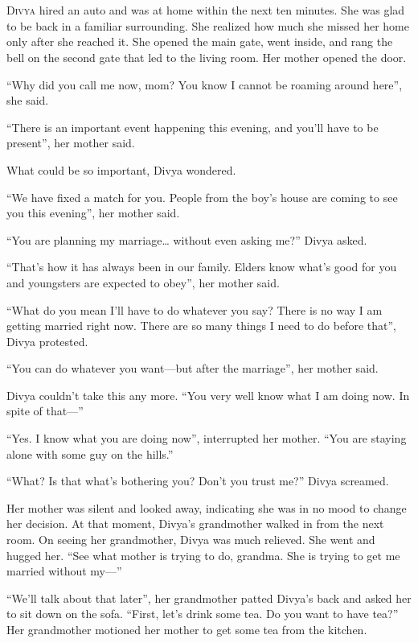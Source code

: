 \chapter{}

\lettrine{D}{ivya} hired an auto and was at home within the next ten minutes.
She was glad to be back in a familiar surrounding. She realized how much she
missed her home only after she reached it. She opened the main gate, went
inside, and rang the bell on the second gate that led to the living room. Her
mother opened the door.

“Why did you call me now, mom? You know I cannot be roaming around here”, she
said.

“There is an important event happening this evening, and you'll have to be
present”, her mother said.

What could be so important, Divya wondered.

“We have fixed a match for you. People from the boy's house are coming to see
you this evening”, her mother said.

“You are planning my marriage… without even asking me?” Divya asked.

“That's how it has always been in our family. Elders know what's good for you
and youngsters are expected to obey”, her mother said.

“What do you mean I'll have to do whatever you say? There is no way I am getting
married right now. There are so many things I need to do before that”, Divya
protested.

“You can do whatever you want—but after the marriage”, her mother said.

Divya couldn't take this any more. “You very well know what I am doing now. In
spite of that—”

“Yes. I know what you are doing now”, interrupted her mother. “You are staying
alone with some guy on the hills.”

“What? Is that what's bothering you? Don't you trust me?” Divya screamed.

Her mother was silent and looked away, indicating she was in no mood to change
her decision. At that moment, Divya's grandmother walked in from the next room.
On seeing her grandmother, Divya was much relieved. She went and hugged her. “See
what mother is trying to do, grandma. She is trying to get me married without
my—”

“We'll talk about that later”, her grandmother patted Divya's back and asked her
to sit down on the sofa. “First, let's drink some tea. Do you want to
have tea?” Her grandmother motioned her mother to get some tea from the kitchen.

